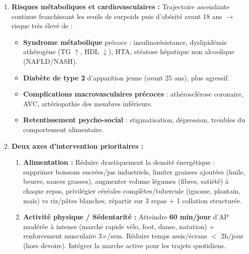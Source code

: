 \documentclass[11pt]{article}
\begin{document}
\begin{corrige}
\begin{enumerate}
\item \textbf{Risques métaboliques et cardiovasculaires :}
Trajectoire ascendante continue franchissant les seuils de surpoids puis d'obésité avant 18 ans $\rightarrow$ risque très élevé de :
\begin{itemize}
\item \textbf{Syndrome métabolique} précoce : insulinorésistance, dyslipidémie athérogène (TG $\uparrow$, HDL $\downarrow$), HTA, stéatose hépatique non alcoolique (NAFLD/NASH).
\item \textbf{Diabète de type 2} d'apparition jeune (avant 25 ans), plus agressif.
\item \textbf{Complications macrovasculaires précoces} : athérosclérose coronaire, AVC, artériopathie des membres inférieurs.
\item \textbf{Retentissement psycho-social} : stigmatisation, dépression, troubles du comportement alimentaire.
\end{itemize}

\item \textbf{Deux axes d'intervention prioritaires :}
\begin{enumerate}
\item \textbf{Alimentation :} Réduire drastiquement la densité énergétique : supprimer boissons sucrées/jus industriels, limiter graisses ajoutées (huile, beurre, sauces grasses), augmenter volume légumes (fibres, satiété) à chaque repas, privilégier céréales complètes/tubercule (ignome, plantain, maïs) vs riz/pâtes blanches, répartir sur 3 repas + 1 collation structurée.
\item \textbf{Activité physique / Sédentarité :} Atteindre \textbf{60 min/jour} d'AP modérée à intense (marche rapide vélo, foot, danse, natation) + renforcement musculaire 3$\times$/sem. Réduire temps assis/écrans $<$ 2h/jour (hors devoirs). Intégrer la marche active pour les trajets quotidiens.
\end{enumerate}
\end{enumerate}
\end{corrige}
\end{document}
